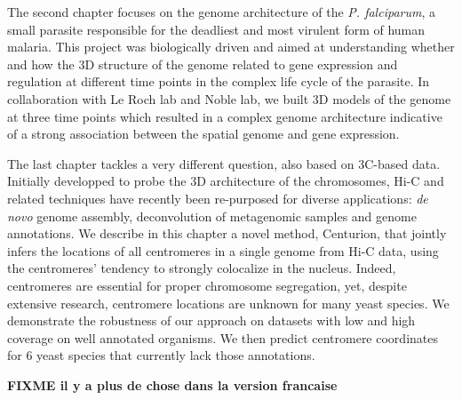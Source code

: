\begin{abstracts}
The second chapter focuses on the genome architecture of the {\em P.
falciparum}, a small parasite responsible for the deadliest and most virulent
form of human malaria. This project was biologically driven and aimed at
understanding whether and how the 3D structure of the genome related to gene
expression and regulation at different time points in the complex life cycle
of the parasite. In collaboration with Le Roch lab and Noble lab, we built 3D
models of the genome at three time points which resulted in a complex genome
architecture indicative of a strong association between the spatial genome and
gene expression.

The last chapter tackles a very different question, also based on 3C-based
data. Initially developped to probe the 3D architecture of the chromosomes,
Hi-C and related techniques have recently been re-purposed for diverse
applications: \textit{de novo} genome assembly, deconvolution of metagenomic
samples and genome annotations. We describe in this chapter a novel method,
Centurion, that jointly infers the locations of all centromeres in a single
genome from Hi-C data, using the centromeres' tendency to strongly colocalize
in the nucleus.  Indeed, centromeres are essential for proper chromosome
segregation, yet, despite extensive research, centromere locations are unknown
for many yeast species. We demonstrate the robustness of our approach on
datasets with low and high coverage on well annotated organisms. We then
predict centromere coordinates for 6 yeast species that currently lack those
annotations.

\textbf{FIXME il y a plus de chose dans la version francaise}

\end{abstracts}


